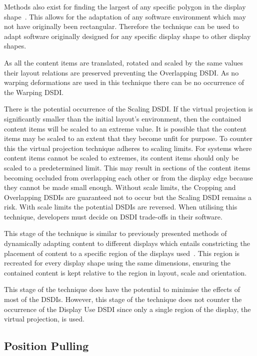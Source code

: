 \documentclass[review,5p,times,twocolumn]{elsarticle}
\begin{document}
Methods also exist for finding the largest of any specific polygon in the display shape~\cite{Toussaint1983}. 
This allows for the adaptation of any software environment which may not have originally been rectangular.
Therefore the technique can be used to adapt software originally designed for any specific display shape to other display shapes.

As all the content items are translated, rotated and scaled by the same values their layout relations are preserved preventing the Overlapping \ac{DSDI}.
As no warping deformations are used in this technique there can be no occurrence of the Warping \ac{DSDI}.

There is the potential occurrence of the Scaling \ac{DSDI}.
If the virtual projection is significantly smaller than the initial layout's environment, then the contained content items will be scaled to an extreme value.
It is possible that the content items may be scaled to an extent that they become unfit for purpose.
To counter this the virtual projection technique adheres to scaling limits.
For systems where content items cannot be scaled to extremes, its content items should only be scaled to a predetermined limit.
This may result in sections of the content items becoming occluded from overlapping each other or from the display edge because they cannot be made small enough.
Without scale limits, the Cropping and Overlapping \acp{DSDI} are guaranteed not to occur but the Scaling \ac{DSDI} remains a risk.
With scale limits the potential \acp{DSDI} are reversed.
When utilising this technique, developers must decide on \ac{DSDI} trade-offs in their software.

This stage of the technique is similar to previously presented methods of dynamically adapting content to different displays which entails constricting the placement of content to a specific region of the displays used~\cite{Cotting2006,Raskar2003}.
This region is recreated for every display shape using the same dimensions, ensuring the contained content is kept relative to the region in layout, scale and orientation.

This stage of the technique does have the potential to minimise the effects of most of the \acp{DSDI}.
However, this stage of the technique does not counter the occurrence of the Display Use \ac{DSDI} since only a single region of the display, the virtual projection, is used.

\subsection{Position Pulling}
\label{subsec:positionpulling} 
\end{document}

